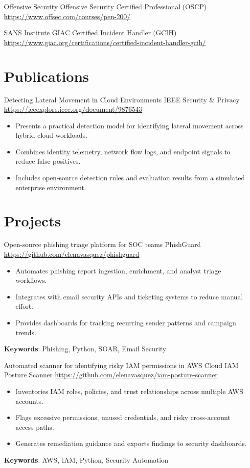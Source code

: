 \documentclass[a4paper, serif, 10pt]{moderncv}
\begin{document}
        {Offensive Security}
        {Offensive Security Certified Professional (OSCP)}
        {\url{https://www.offsec.com/courses/pen-200/}}
        {}
        {}

        {SANS Institute}
        {GIAC Certified Incident Handler (GCIH)}
        {\url{https://www.giac.org/certifications/certified-incident-handler-gcih/}}
        {}
        {}
\section{Publications}

        {Detecting Lateral Movement in Cloud Environments}
        {IEEE Security \& Privacy}
        {\url{https://ieeexplore.ieee.org/document/9876543}}
        {}
        {\begin{itemize}
\item Presents a practical detection model for identifying lateral movement across hybrid cloud workloads.
\item Combines identity telemetry, network flow logs, and endpoint signals to reduce false positives.
\item Includes open-source detection rules and evaluation results from a simulated enterprise environment.
\end{itemize}}
\section{Projects}

        {Open-source phishing triage platform for SOC teams}
        {PhishGuard}
        {\url{https://github.com/elenavasquez/phishguard}}
        {}
        {\begin{itemize}
\item Automates phishing report ingestion, enrichment, and analyst triage workflows.
\item Integrates with email security APIs and ticketing systems to reduce manual effort.
\item Provides dashboards for tracking recurring sender patterns and campaign trends.
\end{itemize}
\textbf{Keywords}: Phishing, Python, SOAR, Email Security}

        {Automated scanner for identifying risky IAM permissions in AWS}
        {Cloud IAM Posture Scanner}
        {\url{https://github.com/elenavasquez/iam-posture-scanner}}
        {}
        {\begin{itemize}
\item Inventories IAM roles, policies, and trust relationships across multiple AWS accounts.
\item Flags excessive permissions, unused credentials, and risky cross-account access paths.
\item Generates remediation guidance and exports findings to security dashboards.
\end{itemize}
\textbf{Keywords}: AWS, IAM, Python, Security Automation}
\end{document}
